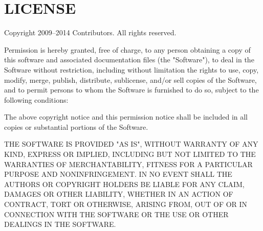 \chapter{LICENSE}
\hypertarget{md_pkiclassroomrescheduler_2src_2main_2frontend_2node__modules_2asap_2_l_i_c_e_n_s_e}{}\label{md_pkiclassroomrescheduler_2src_2main_2frontend_2node__modules_2asap_2_l_i_c_e_n_s_e}
Copyright 2009–2014 Contributors. All rights reserved.

Permission is hereby granted, free of charge, to any person obtaining a copy of this software and associated documentation files (the "{}\+Software"{}), to deal in the Software without restriction, including without limitation the rights to use, copy, modify, merge, publish, distribute, sublicense, and/or sell copies of the Software, and to permit persons to whom the Software is furnished to do so, subject to the following conditions\+:

The above copyright notice and this permission notice shall be included in all copies or substantial portions of the Software.

THE SOFTWARE IS PROVIDED "{}\+AS IS"{}, WITHOUT WARRANTY OF ANY KIND, EXPRESS OR IMPLIED, INCLUDING BUT NOT LIMITED TO THE WARRANTIES OF MERCHANTABILITY, FITNESS FOR A PARTICULAR PURPOSE AND NONINFRINGEMENT. IN NO EVENT SHALL THE AUTHORS OR COPYRIGHT HOLDERS BE LIABLE FOR ANY CLAIM, DAMAGES OR OTHER LIABILITY, WHETHER IN AN ACTION OF CONTRACT, TORT OR OTHERWISE, ARISING FROM, OUT OF OR IN CONNECTION WITH THE SOFTWARE OR THE USE OR OTHER DEALINGS IN THE SOFTWARE. 